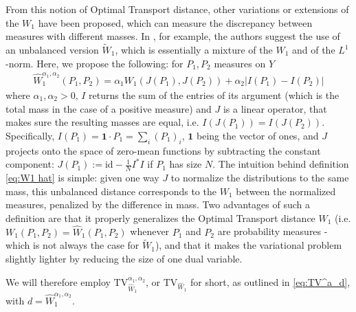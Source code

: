 \documentclass[journal,twoside,web]{ieeecolor}
\begin{document}
From this notion of Optimal Transport distance, other variations or extensions of the $W_1$ have been proposed, which can measure the discrepancy between measures with different masses. In \cite{TVW_Theory}, for example, the authors suggest the use of an unbalanced version $\widetilde{W}_1$, which is essentially a mixture of the $W_1$ and of the $L^1$-norm.
Here, we propose the following: for $P_1,P_2$ measures on $Y$
\begin{align} \label{eq:W1 hat}
    \hat{W}_1^{\alpha_1,\alpha_2}(P_1,P_2) = \alpha_1 W_1(J(P_1),J(P_2)) + \alpha_2 \big| I(P_1) - I(P_2) \big|
\end{align}
where $\alpha_1,\alpha_2>0$, $I$ returns the sum of the entries of its argument (which is the total mass in the case of a positive measure) and $J$ is a linear operator, that makes sure the resulting masses are equal, i.e. $ I(J(P_1)) = I(J(P_2)) $.
Specifically, $I(P_1) = \mathbf{1} \cdot P_1 = \sum_i (P_1)_i$, $\mathbf{1}$ being the vector of ones, and $J$ projects onto the space of zero-mean functions by subtracting the constant component: $J(P_1):= \mathrm{id} - \tfrac{1}{N} I^*I$ if $P_1$ has size $N$.
The intuition behind definition \eqref{eq:W1 hat} is simple: given one way $J$ to normalize the distributions to the same mass, this unbalanced distance corresponds to the $W_1$ between the normalized measures, penalized by the difference in mass. Two advantages of such a definition are that it properly generalizes the Optimal Transport distance $W_1$ (i.e. $W_1({P}_1,{P}_2) = \hat{W}_1({P}_1,{P}_2)$ whenever $P_1$ and $P_2$ are probability measures - which is not always the case for $\widetilde{W}_1$), and that it makes the variational problem slightly lighter by reducing the size of one dual variable.

We will therefore employ $\mathrm{TV}_{\hat{W}_1}^{\alpha_1,\alpha_2}$, or $\mathrm{TV}_{\hat{W}_1 }$ for short, as outlined in \eqref{eq:TV^a_d}, with $d=\hat{W}_1^{\alpha_1,\alpha_2}$.
\end{document}
